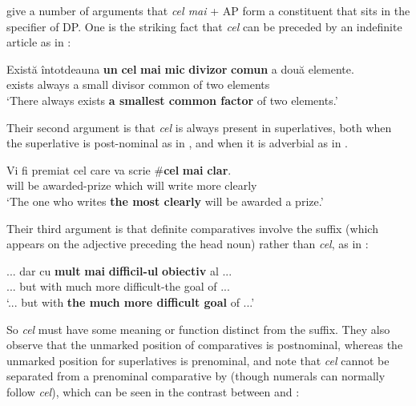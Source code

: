 \documentclass[output=paper
,modfonts
,nonflat]{langsci/langscibook}
\begin{document}
\citet{Dobrovie-SorinGiurgea2015} give a number of arguments that \textit{cel mai} + AP form a constituent that sits in the specifier of DP. One is the striking fact that
\textit{cel} can be preceded by an indefinite article as in  \citep[15, ex.\ 64]{Dobrovie-SorinGiurgea2015}:

\ea \label{ex:coppockstrand:35}
\gll Există \^intotdeauna \textbf{un} \textbf{cel} \textbf{mai} \textbf{mic} \textbf{divizor} \textbf{comun} a două elemente.\\
exists always a  \cmpr{} small divisor common of two elements\\
\glt `There always exists \textbf{a smallest common factor} of two elements.'
\z

Their second argument is that \textit{cel} is always present in superlatives, both when the superlative is post-nominal as in , and when it is adverbial as in . 

\ea \label{ex:coppockstrand:36}
\gll Vi fi premiat cel care va scrie \textnormal{\#}{\op}\textbf{cel}{\cp} \textbf{mai} \textbf{clar}.\\
will be awarded-prize  which will write \phantom{\#(} more clearly\\
\glt `The one who writes \textbf{the most clearly} will be awarded a prize.' \citep[15, ex.\ 66]{Dobrovie-SorinGiurgea2015}
\z

Their third argument is that definite comparatives involve the suffix (which appears on the adjective preceding the head noun) rather than \textit{cel}, as in :

\ea \label{ex:coppockstrand:37}
\gll ... dar cu \textbf{mult} \textbf{mai} \textbf{difficil-ul} \textbf{obiectiv} al ...\\
... but with much more difficult-the goal of ... \\
\glt `... but with \textbf{the much more difficult goal} of ...'
\z

So \textit{cel} must have some meaning or function distinct from the suffix. They also observe that the unmarked position of comparatives is postnominal, whereas the unmarked position for superlatives is prenominal, and note that \textit{cel} cannot be separated from a prenominal comparative by  (though numerals can normally follow \textit{cel}), which can be seen in the contrast between  and :
\end{document}
